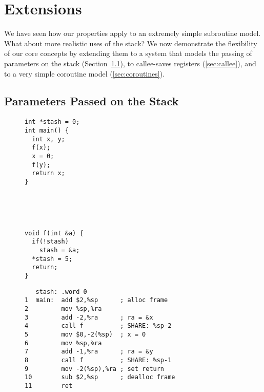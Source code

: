 \documentclass[10pt,conference]{ieeetran}%
\theoremstyle{definition}
\begin{document}
{\section{Extensions}
\label{sec:ext}

We have seen how our properties apply to an extremely simple
subroutine model.
What about more realistic uses of the stack? We now demonstrate the
flexibility of our core concepts by extending
them to a system that models the passing of
parameters on the stack (Section~\ref{sec:passing}), to callee-saves
registers  (\ref{sec:callee}), and to a very simple coroutine model
(\ref{sec:coroutines}).

\subsection{Parameters Passed on the Stack}
\label{sec:passing}

\newcommand{\mainpassc}{magenta}

\begin{figure*}
  \centering
  \begin{subfigure}[t]{.2\textwidth}
{\small
\begin{verbatim}
int *stash = 0;
int main() {
  int x, y;
  f(x);
  x = 0;
  f(y);
  return x;
}





void f(int &a) {
  if(!stash)
    stash = &a;
  *stash = 5;
  return;
}
\end{verbatim}
}
  \end{subfigure}
  \begin{subfigure}[t]{.4\textwidth}
{\small
\begin{verbatim}
   stash: .word 0
1  main:  add $2,%sp      ; alloc frame
2         mov %sp,%ra
3         add -2,%ra      ; ra = &x
4         call f          ; SHARE: %sp-2
5         mov $0,-2(%sp)  ; x = 0
6         mov %sp,%ra
7         add -1,%ra      ; ra = &y
8         call f          ; SHARE: %sp-1
9         mov -2(%sp),%ra ; set return
10        sub $2,%sp      ; dealloc frame
11        ret


\end{verbatim}}
\end{subfigure}
\end{figure*}}
\end{document}
